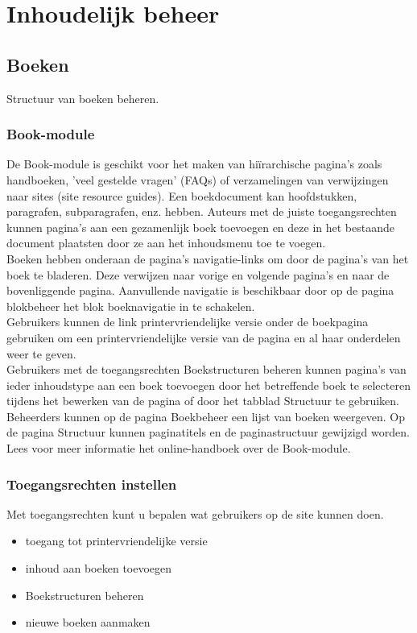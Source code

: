 \chapter{Inhoudelijk beheer} 
\section{Boeken}
Structuur van boeken beheren.
\subsection{Book-module} 
De Book-module is geschikt voor het maken van hi\"irarchische pagina's zoals
handboeken, 'veel gestelde vragen' (FAQs) of verzamelingen van verwijzingen naar sites (site resource guides).
Een boekdocument kan hoofdstukken, paragrafen, subparagrafen, enz. hebben. Auteurs met de juiste
toegangsrechten kunnen pagina's aan een gezamenlijk boek toevoegen en deze in het bestaande document
 plaatsten door ze aan het inhoudsmenu toe te voegen.
\\
Boeken hebben onderaan de pagina's navigatie-links  om
door de pagina's van het boek te bladeren. Deze verwijzen naar vorige en volgende pagina's en naar de bovenliggende pagina.
Aanvullende navigatie is beschikbaar door op de pagina blokbeheer het blok
boeknavigatie  in te schakelen.
\\
Gebruikers kunnen de link printervriendelijke versie  onder
de boekpagina gebruiken om een printervriendelijke versie van de pagina en al haar onderdelen weer te geven.
\\
Gebruikers met de toegangsrechten Boekstructuren beheren kunnen pagina's van
ieder inhoudstype aan een boek toevoegen door het betreffende boek te selecteren tijdens het
bewerken van de pagina of door het tabblad Structuur te gebruiken.
\\
Beheerders kunnen op de pagina Boekbeheer een lijst van boeken weergeven.
Op de pagina Structuur kunnen paginatitels en de paginastructuur gewijzigd worden.
\\
Lees voor meer informatie het online-handboek over de Book-module.
\subsection{Toegangsrechten instellen} 
Met toegangsrechten kunt u bepalen wat gebruikers op de site kunnen doen.
\begin{itemize}
\item toegang tot printervriendelijke versie
\item inhoud aan boeken toevoegen
\item Boekstructuren beheren
\item nieuwe boeken aanmaken
\end{itemize}
